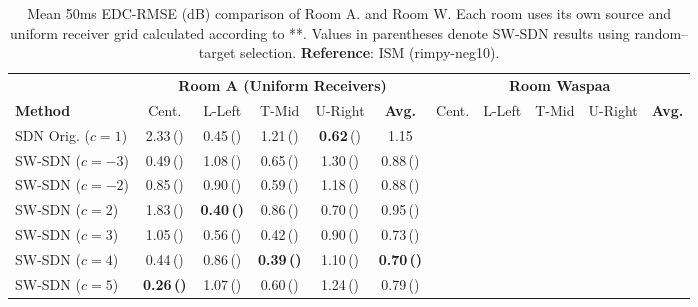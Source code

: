 \documentclass[journal]{IEEEtran}
\begin{document}
\begin{table}[tbh]
    \centering
    \caption{Mean 50ms EDC-RMSE (dB) comparison of Room A. and Room W. Each room uses its own source and uniform receiver grid calculated according to **.  Values in parentheses denote SW-SDN results using random–target selection. \textbf{Reference}: ISM (rimpy-neg10).}
    \label{tab:merged-results-waspaa}
    \renewcommand{\arraystretch}{1.15}
    \scriptsize
    \setlength{\tabcolsep}{2.5pt}
    
    \begin{tabular}{l ccccc | ccccc}
        \toprule
        & \multicolumn{5}{c|}{\textbf{Room A (Uniform Receivers)}} & \multicolumn{5}{c}{\textbf{Room Waspaa}} \\
        \cmidrule(lr){2-6} \cmidrule(l){7-11}
        \textbf{Method} & Cent. & L-Left & T-Mid & U-Right & \textbf{Avg.} & Cent. & L-Left & T-Mid & U-Right & \textbf{Avg.} \\
        \midrule
        
        SDN Orig. ($c=1$)
            & 2.33\,() & 0.45\,() & 1.21\,() & \textbf{0.62}\,() & 1.15 
            & & & & & \\
        \midrule
        
        SW-SDN ($c=-3$)
            & 0.49\,() & 1.08\,() & 0.65\,() & 1.30\,() & 0.88\,() 
            & & & & & \\
            
        SW-SDN ($c=-2$)
            & 0.85\,() & 0.90\,() & 0.59\,() & 1.18\,() & 0.88\,() 
            & & & & & \\
            
        SW-SDN ($c=2$)
            & 1.83\,() & \textbf{0.40\,()} & 0.86\,() & 0.70\,() & 0.95\,() 
            & & & & & \\
            
        SW-SDN ($c=3$)
            & 1.05\,() & 0.56\,() & 0.42\,() & 0.90\,() & 0.73\,() 
            & & & & & \\
            
        SW-SDN ($c=4$)
            & 0.44\,() & 0.86\,() & \textbf{0.39\,()} & 1.10\,() & \textbf{0.70\,()} 
            & & & & & \\
            
        SW-SDN ($c=5$)
            & \textbf{0.26\,()} & 1.07\,() & 0.60\,() & 1.24\,() & 0.79\,() 
            & & & & & \\
            

\end{tabular}
\end{table}
\end{document}
